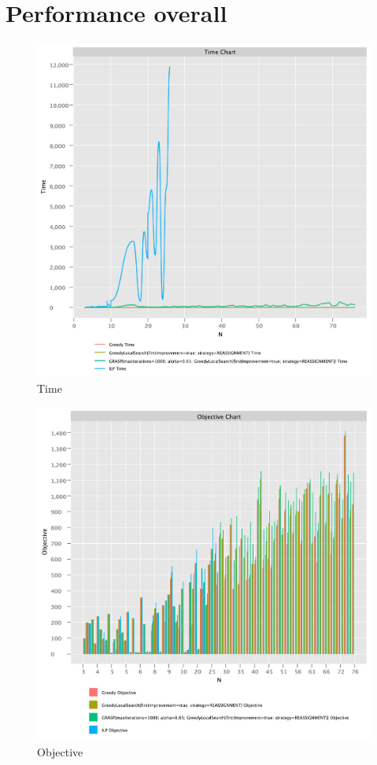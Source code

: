 \documentclass{article}
\begin{document}
\newpage

\section{Performance overall}

\begin{figure}[!h]
    \centering
    \includegraphics[width=1\textwidth]{./documentation/assets/all.timeChart.pdf}
    \caption{Time}
    \label{fig:all_time}
\end{figure}\FloatBarrier

\begin{figure}
    \centering
    \includegraphics[width=1\textwidth]{./documentation/assets/all.objectiveChart.pdf}
    \caption{Objective}
    \label{fig:all_objective}
\end{figure}\FloatBarrier
\end{document}
